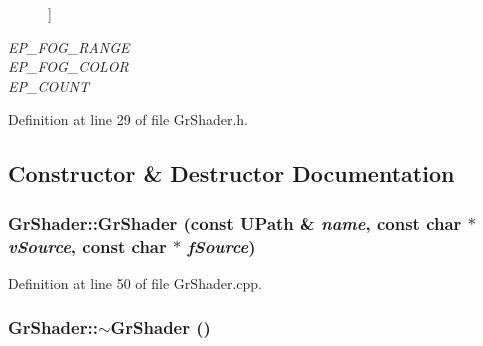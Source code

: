 \begin{CompactItemize}
\begin{Desc}
\begin{description}
{}]\item[{\em 
\hypertarget{class_gr_shader_2f004c603bb97711d05eb68381a5a7bad96706cfb5f9b798c98f8c12bb6b0862}{
EP\_\-FOG\_\-RANGE}
\label{class_gr_shader_2f004c603bb97711d05eb68381a5a7bad96706cfb5f9b798c98f8c12bb6b0862}
}]\item[{\em 
\hypertarget{class_gr_shader_2f004c603bb97711d05eb68381a5a7ba74327915bc548e45e31bbe4ffc1f6336}{
EP\_\-FOG\_\-COLOR}
\label{class_gr_shader_2f004c603bb97711d05eb68381a5a7ba74327915bc548e45e31bbe4ffc1f6336}
}]\item[{\em 
\hypertarget{class_gr_shader_2f004c603bb97711d05eb68381a5a7ba5824c13eb2e93df0317ef2af40eabace}{
EP\_\-COUNT}
\label{class_gr_shader_2f004c603bb97711d05eb68381a5a7ba5824c13eb2e93df0317ef2af40eabace}
}]\end{description}
\end{Desc}



Definition at line 29 of file GrShader.h.

\subsection{Constructor \& Destructor Documentation}
\hypertarget{class_gr_shader_bdf1c0db4547dc0f83a672954a110ee3}{
\subsubsection[{GrShader}]{\setlength{\rightskip}{0pt plus 5cm}GrShader::GrShader (const {\bf UPath} \& {\em name}, \/  const char $\ast$ {\em vSource}, \/  const char $\ast$ {\em fSource})}}
\label{class_gr_shader_bdf1c0db4547dc0f83a672954a110ee3}




Definition at line 50 of file GrShader.cpp.\hypertarget{class_gr_shader_aa73966b218a209656f7e2c594d290ce}{
\subsubsection[{$\sim$GrShader}]{\setlength{\rightskip}{0pt plus 5cm}GrShader::$\sim$GrShader ()}}
\label{class_gr_shader_aa73966b218a209656f7e2c594d290ce}





\end{CompactItemize}
